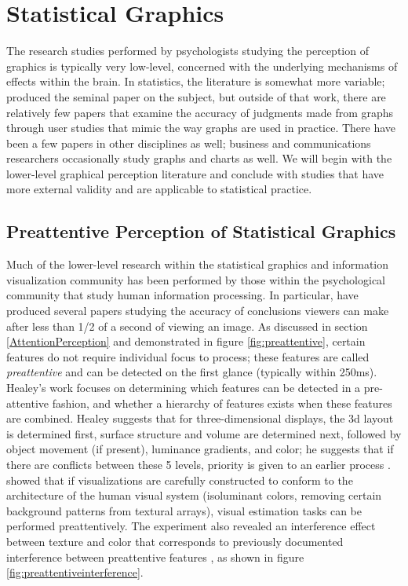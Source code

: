 \documentclass[11pt]{isuthesis}\usepackage[]{graphicx}\usepackage[]{color}
\begin{document}
\section{Statistical Graphics}
The research studies performed by psychologists studying the perception of graphics is typically very low-level, concerned with the underlying mechanisms of effects within the brain. In statistics, the literature is somewhat more variable; \citet{cleveland:1985} produced the seminal paper on the subject, but outside of that work, there are relatively few papers that examine the accuracy of judgments made from graphs through user studies that mimic the way graphs are used in practice. There have been a few papers in other disciplines as well; business and communications researchers occasionally study graphs and charts as well. We will begin with the lower-level graphical perception literature and conclude with studies that have more external validity and are applicable to statistical practice. 

\subsection{Preattentive Perception of Statistical Graphics}\label{LowLevelGraphics}
Much of the lower-level research within the statistical graphics and information visualization community has been performed by those within the psychological community that study human information processing. In particular, \citet{healey1999large, healey2012attention} have produced several papers studying the accuracy of conclusions viewers can make after less than 1/2 of a second of viewing an image. As discussed in section \ref{AttentionPerception} and demonstrated in figure \ref{fig:preattentive}, certain features do not require individual focus to process; these features are called \emph{preattentive} and can be detected on the first glance (typically within 250ms). Healey's work focuses on determining which features can be detected in a pre-attentive fashion, and whether a hierarchy of features exists when these features are combined. Healey suggests that for three-dimensional displays, the 3d layout is determined first, surface structure and volume are determined next, followed by object movement (if present), luminance gradients, and color; he suggests that if there are conflicts between these 5 levels, priority is given to an earlier process \citep{healey2012attention}. \citet{healey1999large} showed that if visualizations are carefully constructed to conform to the architecture of the human visual system (isoluminant colors, removing certain background patterns from textural arrays), visual estimation tasks can be performed preattentively. The experiment also revealed an interference effect between texture and color that corresponds to previously documented interference between preattentive features \citep{treisman1985preattentive}, as shown in figure \ref{fig:preattentiveinterference}.
\end{document}
